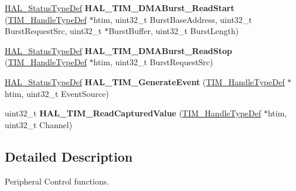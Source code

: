 \begin{DoxyCompactItemize}
\mbox{\hyperlink{stm32f7xx__hal__def_8h_a63c0679d1cb8b8c684fbb0632743478f}{H\+A\+L\+\_\+\+Status\+Type\+Def}} {\bfseries H\+A\+L\+\_\+\+T\+I\+M\+\_\+\+D\+M\+A\+Burst\+\_\+\+Read\+Start} (\mbox{\hyperlink{struct_t_i_m___handle_type_def}{T\+I\+M\+\_\+\+Handle\+Type\+Def}} $\ast$htim, uint32\+\_\+t Burst\+Base\+Address, uint32\+\_\+t Burst\+Request\+Src, uint32\+\_\+t $\ast$Burst\+Buffer, uint32\+\_\+t Burst\+Length)
\item 
\mbox{\label{group___t_i_m___exported___functions___group8_ga41cfa290ee87229cba1962e78e2a9d01}} 
\mbox{\hyperlink{stm32f7xx__hal__def_8h_a63c0679d1cb8b8c684fbb0632743478f}{H\+A\+L\+\_\+\+Status\+Type\+Def}} {\bfseries H\+A\+L\+\_\+\+T\+I\+M\+\_\+\+D\+M\+A\+Burst\+\_\+\+Read\+Stop} (\mbox{\hyperlink{struct_t_i_m___handle_type_def}{T\+I\+M\+\_\+\+Handle\+Type\+Def}} $\ast$htim, uint32\+\_\+t Burst\+Request\+Src)
\item 
\mbox{\label{group___t_i_m___exported___functions___group8_gab4a60fe7cbb64a321bdce2ee1b9c8730}} 
\mbox{\hyperlink{stm32f7xx__hal__def_8h_a63c0679d1cb8b8c684fbb0632743478f}{H\+A\+L\+\_\+\+Status\+Type\+Def}} {\bfseries H\+A\+L\+\_\+\+T\+I\+M\+\_\+\+Generate\+Event} (\mbox{\hyperlink{struct_t_i_m___handle_type_def}{T\+I\+M\+\_\+\+Handle\+Type\+Def}} $\ast$htim, uint32\+\_\+t Event\+Source)
\item 
\mbox{\label{group___t_i_m___exported___functions___group8_ga6528480e73e4e51d5ce8aaca00d64d13}} 
uint32\+\_\+t {\bfseries H\+A\+L\+\_\+\+T\+I\+M\+\_\+\+Read\+Captured\+Value} (\mbox{\hyperlink{struct_t_i_m___handle_type_def}{T\+I\+M\+\_\+\+Handle\+Type\+Def}} $\ast$htim, uint32\+\_\+t Channel)
\end{DoxyCompactItemize}


\subsection{Detailed Description}
Peripheral Control functions. 


